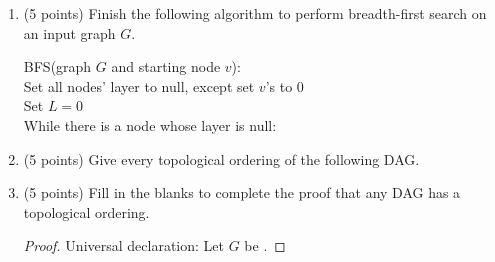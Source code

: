 \documentclass[11pt]{article}
\begin{document}
\begin{enumerate}
\newpage

\begin{center}
\LARGE\textbf{Section 3 (Graph Algorithms)\\}%
\end{center}

\item (5 points) Finish the following algorithm to perform breadth-first search on an input graph $G$.

    \begin{algo}
    BFS(graph $G$ and starting node $v$):\+\\
    Set all nodes' layer to null, except set $v$'s to 0\\
    Set $L=0$\\
    While there is a node whose layer is null:\+\\[1in]    
    \hspace{5in}
    \end{algo} 
\vspace{1in}

\item (5 points) Give every topological ordering of the following DAG. 


\newpage



\item (5 points) Fill in the blanks to complete the proof that any DAG has a topological ordering.

\begin{proof}
    
Universal declaration: Let $G$ be \underline{\hspace{3in}}.


\end{proof}
\end{enumerate}
\end{document}

